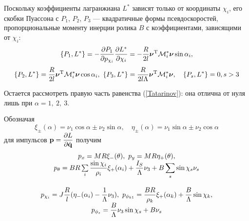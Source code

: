 Поскольку коэффициенты  лагранжиана $L^{*}$ зависят только от координаты $\chi_i$, его скобки Пуассона с $P_1$, $P_2$, $P_3$  --- квадратичные формы псевдоскоростей, пропорциональные моменту инерции ролика $B$ с коэффициентами, зависящими от $\chi_i$:
$$
\{P_1, L^*\} = -\frac{\partial P_1}{\partial p_{\chi_i}}\frac{\partial L^*}{\partial \chi_i} = -\frac{R}{2l}\boldsymbol{\mathbf{\nu}}^\mathrm{T}\mathcal{M}^*_i\boldsymbol{\mathbf{\nu}}\sin\alpha_i,
$$
$$
\{P_2, L^*\} = \frac{R}{2l}\boldsymbol{\mathbf{\nu}}^\mathrm{T}\mathcal{M}^*_i\boldsymbol{\mathbf{\nu}}\cos\alpha_i,\  
\{P_3, L^*\} = \frac{R}{2l\Lambda}\boldsymbol{\mathbf{\nu}}^\mathrm{T}\mathcal{M}^*_i\boldsymbol{\mathbf{\nu}},\quad \{P_s,L^*\} = 0, s>3
$$

Остается рассмотреть правую часть равенства (\ref{Tatarinov}): она отлична от нуля лишь при $\alpha = 1,\ 2,\ 3$.

Обозначая
$$\xi_\pm(\alpha) = \nu_1\cos\alpha \pm \nu_2\sin\alpha, \quad \eta_\pm(\alpha) = \nu_1\sin\alpha \pm \nu_2\cos\alpha$$
для импульсов $\boldsymbol{\mathbf{p}} = \displaystyle\frac{\displaystyle \partial L}{\displaystyle \partial \dot{\boldsymbol{\mathbf{q}}}}$ получим
\begin{equation}\label{p}
    \begin{array}{c}
        p_x  =  MR\xi_-(\theta), \ p_y = MR\eta_+(\theta),\\
        p_\theta  =  BR\sum\limits_i\ddfrac{\sin\chi_i}{\rho_i}\xi_+(\alpha_i) + \ddfrac{I_S}{\Lambda}\nu_3 + B\sum\limits_s\sin\chi_s\nu_s\vsp \\
        p_{\chi_i}  =  J\ddfrac{R}{l}(\eta_-(\alpha_i) - \ddfrac{1}{\Lambda}\nu_3), \ p_{\phi_{k1}}  =  \ddfrac{BR}{\rho_k}\xi_+(\alpha_k)+\ddfrac{B}{\Lambda}\sin\chi_k,\\
        p_{\phi_s}  =  \ddfrac{B}{\Lambda}\nu_3\sin\chi_s + B\nu_s
    \end{array}
\end{equation}

